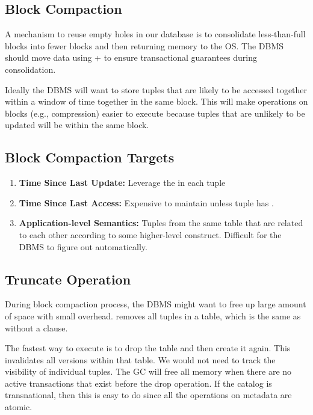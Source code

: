 \documentclass[11pt]{article}
\begin{document}
\subsection*{Block Compaction}
A mechanism to reuse empty holes in our database is to consolidate less-than-full blocks into fewer 
blocks and then returning memory to the OS. The DBMS should move data using + 
 to ensure
transactional guarantees during consolidation.

Ideally the DBMS will want to store tuples that are likely to be accessed together within a window 
of time together in the same block. This will make operations on blocks (e.g., compression) easier 
to execute because tuples that are unlikely to be updated will be within the same block.

\subsection*{Block Compaction Targets}
\begin{enumerate}
    \item \textbf{Time Since Last Update:} Leverage the  in each tuple
    \item \textbf{Time Since Last Access:} Expensive to maintain unless tuple has .
    \item \textbf{Application-level Semantics:} Tuples from the same table that are related to each 
other according to some higher-level construct. Difficult for the DBMS to figure out automatically.
\end{enumerate}
\subsection*{Truncate Operation}
During block compaction process, the DBMS might want to free up large amount of space with small 
overhead.  removes all tuples in a table, which is the same as  without a 
 clause. 

The fastest way to execute  is to drop the table and then create it again. This 
invalidates all versions within that table. We would not need to track the visibility of individual 
tuples. The GC will free all memory when there are no active transactions that exist before the drop 
operation. If the catalog is transnational, then this is easy to do since all the operations on 
metadata are atomic.
\newpage


\end{document}

